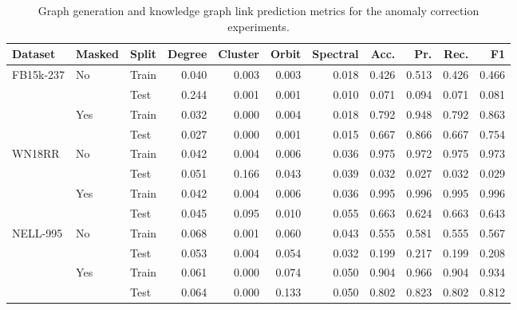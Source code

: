 \begin{table}[H]
    \centering
    \caption{Graph generation and knowledge graph link prediction metrics for the anomaly correction experiments.}
    \label{tab:kg_diffusion_metrics}
    \begin{adjustbox}{width=\textwidth}
    \begin{tabular}{lllrrrrrrrr}
    \toprule
         Dataset & Masked & Split & Degree & Cluster & Orbit & Spectral & Acc. & Pr. & Rec. & F1  \\
    \midrule
         \multirow{4}{*}{FB15k-237} & \multirow{2}{*}{No} & Train & 0.040 & 0.003 & 0.003 & 0.018 & 0.426 & 0.513 & 0.426 & 0.466 \\
         & & Test & 0.244 & 0.001 & 0.001 & 0.010 & 0.071 & 0.094 & 0.071 & 0.081 \\ 
         & \multirow{2}{*}{Yes} & Train & 0.032 & 0.000 & 0.004 & 0.018 & 0.792 & 0.948 & 0.792 & 0.863 \\ 
         & & Test & 0.027 & 0.000 & 0.001 & 0.015 & 0.667 & 0.866 & 0.667 & 0.754 \\ 
         \midrule  
         \multirow{4}{*}{WN18RR} & \multirow{2}{*}{No} & Train & 0.042 & 0.004 & 0.006 & 0.036 & 0.975 & 0.972 & 0.975 & 0.973 \\
         & & Test & 0.051 & 0.166 & 0.043 & 0.039 & 0.032 & 0.027 & 0.032 & 0.029 \\ 
         & \multirow{2}{*}{Yes} & Train & 0.042 & 0.004 & 0.006 & 0.036 & 0.995 & 0.996 & 0.995 & 0.996 \\ 
         & & Test & 0.045 & 0.095 & 0.010 & 0.055 & 0.663 & 0.624 & 0.663 & 0.643 \\ 
         \midrule
         \multirow{4}{*}{NELL-995} & \multirow{2}{*}{No} & Train & 0.068 & 0.001 & 0.060 & 0.043 & 0.555 & 0.581 & 0.555 & 0.567 \\
         & & Test & 0.053 & 0.004 & 0.054 & 0.032 & 0.199 & 0.217 & 0.199 & 0.208 \\ 
         & \multirow{2}{*}{Yes} & Train & 0.061 & 0.000 & 0.074 & 0.050 & 0.904 & 0.966 & 0.904 & 0.934 \\ 
         & & Test & 0.064 & 0.000 & 0.133 & 0.050 & 0.802 & 0.823 & 0.802 & 0.812 \\ 
    \bottomrule
    \end{tabular}
    \end{adjustbox}
\end{table}

